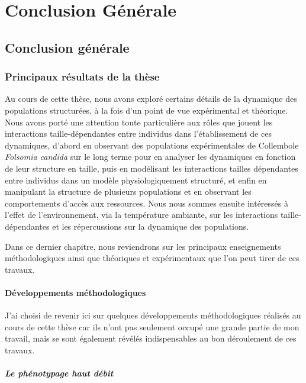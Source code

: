 \part{Conclusion Générale}

\chapter{Conclusion générale}

\section{Principaux résultats de la thèse}

Au cours de cette thèse, nous avons exploré certains détails de la dynamique des
populations structurées, à la fois d'un point de vue expérimental et théorique.
Nous avons porté une attention toute particulière aux rôles que jouent les
interactions taille-dépendantes entre individus dans l'établissement de ces
dynamiques, d'abord en observant des populations expérimentales de Collembole
\textit{Folsomia candida} sur le long terme pour en analyser les dynamiques en
fonction de leur structure en taille, puis en modélisant les interactions
tailles dépendantes entre individus dans un modèle physiologiquement structuré,
et enfin en manipulant la structure de plusieurs populations et en observant les
comportements d'accès aux ressources. Nous nous sommes ensuite intéressés à
l'effet de l'environnement, via la température ambiante, sur les interactions
taille-dépendantes et les répercussions sur la dynamique des populations.

Dans ce dernier chapitre, nous reviendrons sur les principaux enseignements
méthodologiques ainsi que théoriques et expérimentaux que l'on peut tirer de ces
travaux.

\subsection{Développements méthodologiques}

J'ai choisi de revenir ici sur quelques développements méthodologiques réalisés
au cours de cette thèse car ils n'ont pas seulement occupé une grande partie de
mon travail, mais se sont également révélés indispensables au bon déroulement de
ces travaux.

\subsubsection{Le phénotypage haut débit}

